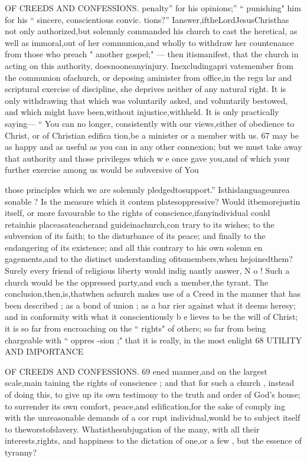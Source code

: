 \documentclass[
]{book}
\begin{document}
OF CREEDS AND CONFESSIONS.
penalty'' for his opinions;'' `` punishing" him for his `` sincere, conscientious convic. tions?'' Ianswer,iftheLordJesusChristhas not only authorized,but solemnly commanded
his church to cast the heretical, as well as
immoral,out of her communion,and wholly to withdraw her countenance from those who
preach " another gospel;" --- then itismanifest,
that the church in acting on this authority, doesnooneanyinjury. Inexcludingapri vatemember from the communion ofachurch, or deposing aminister from office,in the regu lar and scriptural exercise of discipline, she deprives neither of any natural right. It is
only withdrawing that which was voluntarily asked, and voluntarily bestowed, and which
might have been,without injustice,withheld. It is only practically saying--- `` You can no longer, consistently with our views,either of obedience to Christ, or of Christian edifica tion,be a minister or a member with us.
67
may be as happy and as useful as you can in
any other connexion; but we must take away that authority and those privileges which w e once gave you,and of which your further exercise among us would be subversive of
You

those principles which we are solemnly pledgedtosupport.'' Isthislanguageunrea sonable ? Is the measure which it contem
platesoppressive? Would itbemorejustin itself, or more favourable to the rights of conscience,ifanyindividual could retainhis
placeasateacherand guideinachurch,con trary to its wishes; to the subversion of its
faith; to the disturbance of its peace; and finally to the endangering of its existence; and all this contrary to his own solemn en gagements,and to the distinct understanding
ofitsmembers,when hejoinedthem?Surely every friend of religious liberty would indig nantly answer, N o ! Such a church would be
the oppressed party,and such a member,the tyrant.
The conclusion,then,is,thatwhen achurch makes use of a Creed in the manner that has
been described ; as a bond of union ; as a bar rier against what it deems heresy; and in conformity with what it conscientiously b e lieves to be the will of Christ; it is so far from encroaching on the `` rights" of others; so far from being chargeable with `` oppres
-sion ;" that it is really, in the most enlight
68 UTILITY AND IMPORTANCE

OF CREEDS AND CONFESSIONS. 69
ened manner,and on the largest scale,main taining the rights of conscience ; and that for
such a church , instead of doing this, to give up its own testimony to the truth and order of
God's house; to surrender its own comfort, peace,and edification,for the sake of comply
ing with the unreasonable demands of a cor rupt individual,would be to subject itself to
theworstofslavery. Whatisthesubjugation
of the many, with all their interests,rights,
and happiness to the dictation of one,or a few , but the essence of tyranny?
\end{document}

